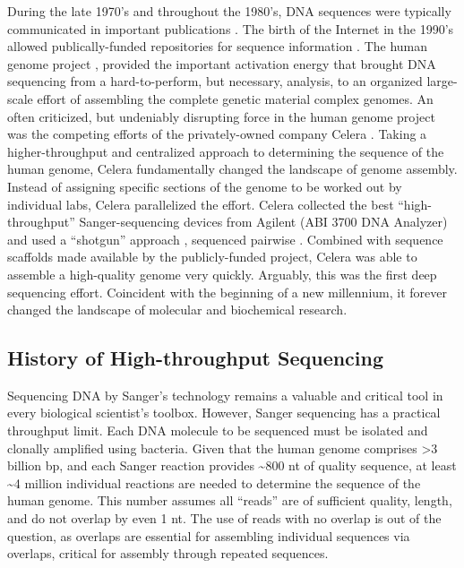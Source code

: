     During the late 1970's and throughout the 1980's, DNA sequences were typically communicated in important publications \citep{Cordell1980a,Sanger1978a}. The birth of the Internet in the 1990's allowed publically-funded repositories for sequence information \citep{Benson2011a}. The human genome project \citep{Lander2011a,Venter2001}, provided the important activation energy that brought DNA sequencing from a hard-to-perform, but necessary, analysis, to an organized large-scale effort of assembling the complete genetic material complex genomes. An often criticized, but undeniably disrupting force in the human genome project was the competing efforts of the privately-owned company Celera \citep{Venter2008a}. Taking a higher-throughput and centralized approach to determining the sequence of the human genome, Celera fundamentally changed the landscape of genome assembly. Instead of assigning specific sections of the genome to be worked out by individual labs, Celera parallelized the effort. Celera collected the best ``high-throughput'' Sanger-sequencing devices from Agilent (ABI 3700 DNA Analyzer) and used a ``shotgun'' approach \citep{Staden1979}, sequenced pairwise \citep{Roach1995}. Combined with sequence scaffolds made available by the publicly-funded project, Celera was able to assemble a high-quality genome very quickly. Arguably, this was the first deep sequencing effort. Coincident with the beginning of a new millennium, it forever changed the landscape of molecular and biochemical research.

  \subsection{History of High-throughput Sequencing}
    \label{Intro:subsec: History of HTS}

    Sequencing DNA by Sanger's technology remains a valuable and critical tool in every biological scientist's toolbox. However, Sanger sequencing has  a practical throughput limit. Each DNA molecule to be sequenced must be isolated and clonally amplified using bacteria. Given that the human genome \citep{Hattori2005a} comprises >3 billion bp, and each Sanger reaction provides \textasciitilde800 nt of quality sequence, at least \textasciitilde4 million individual reactions are needed to determine the sequence of the human genome. This number assumes all ``reads'' are of sufficient quality, length, and do not overlap by even 1 nt. The use of reads with no overlap is out of the question, as overlaps are essential for assembling individual sequences via overlaps, critical for assembly through repeated sequences. 

